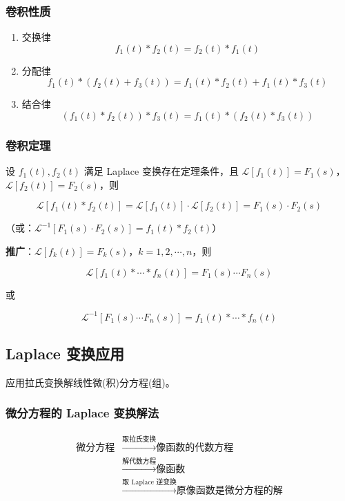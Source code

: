 \subsubsection{卷积性质}
\label{卷积性质}
\begin{enumerate}
\item 交换律
\[
    f_1(t) * f_2(t) = f_2(t) * f_1(t)
    \]
\item 分配律
\[
    f_1(t)*(f_2(t)+f_3(t)) = f_1(t) * f_2(t) + f_1(t) * f_3(t)
    \]
\item 结合律
\[
    (f_1(t) * f_2(t)) * f_3(t) = f_1(t) * (f_2(t) * f_3(t))
    \]
\end{enumerate}
\subsubsection{卷积定理}
\label{卷积定理}
设 \(f_1(t), f_2(t)\) 满足 Laplace 变换存在定理条件，且
\(\mathcal{L}[f_1(t)] = F_1(s)\)，\(\mathcal{L}[f_2(t)] = F_2(s)\)，则

\[
\mathcal{L}[f_1(t) * f_2(t)] = \mathcal{L}[f_1(t)] \cdot \mathcal{L}[f_2(t)] = F_1(s) \cdot F_2(s)
\]

（或：\(\mathcal{L}^{-1}[F_1(s) \cdot F_2(s)] = f_1(t) * f_2(t)\)）

\textbf{推广}：\(\mathcal{L}[f_k(t)] = F_k(s)\)，\(k = 1, 2, \cdots, n\)，则

\[
\mathcal{L}[f_1(t) *\cdots* f_n(t)] = F_1(s) \cdots F_n(s)
\]

或

\[
\mathcal{L}^{-1}[F_1(s) \cdots F_n(s)] = f_1(t) *\cdots* f_n(t)
\]
\subsection{Laplace 变换应用}
\label{laplace-变换应用}
应用拉氏变换解线性微(积)分方程(组)。
\subsubsection{微分方程的 Laplace 变换解法}
\label{微分方程的-laplace-变换解法}
\begin{align*}
    \boxed{\text{微分方程}}
    & \xrightarrow{\text{取拉氏变换}}
    \boxed{\text{像函数的代数方程}} \\
    & \xrightarrow{\text{解代数方程}}
    \boxed{\text{像函数}} \\
    & \xrightarrow{\text{取 Laplace 逆变换}}
    \boxed{\text{原像函数是微分方程的解}}
\end{align*}
